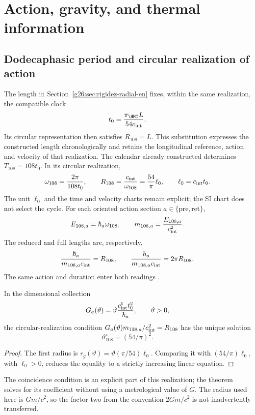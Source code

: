 \section{Action, gravity, and thermal information}
\label{v:ant:sec:gravity}
\subsection{Dodecaphasic period and circular realization of action}
The length in Section~\ref{g26:sec:rigidez-radial-en} fixes, within
the same realization, the compatible clock
\[
 t_0=\frac{\pi_{\HMT}L}{54c_{\rm int}}.
\]
Its circular representation then satisfies \(R_{108}=L\). This
substitution expresses the constructed length chronologically and retains
the longitudinal reference, action and velocity of that realization.
The calendar already constructed determines $T_{108}=108t_0$.
In its circular realization,
\[
\omega_{108}=\frac{2\pi}{108t_0},\qquad
R_{108}=\frac{c_{\rm int}}{\omega_{108}}
=\frac{54}{\pi}\ell_0,\qquad \ell_0=c_{\rm int}t_0.
\]
The unit $\ell_0$ and the time and velocity charts remain
explicit; the SI chart does not select the cycle.
For each oriented action section $a\in\{\mathrm{pre},\mathrm{ret}\}$,
\[
E_{108,a}=\hbar_a\omega_{108},\qquad
m_{108,a}=\frac{E_{108,a}}{c_{\rm int}^2}.
\]
The reduced and full lengths are, respectively,
\[
\frac{\hbar_a}{m_{108,a}c_{\rm int}}=R_{108},
\qquad
\frac{h_a}{m_{108,a}c_{\rm int}}=2\pi R_{108}.
\]
The same action and duration enter both readings
.

\begin{proposition}
In the dimensional collection
\[
G_a(\vartheta)=\vartheta\frac{c_{\rm int}^5t_0^2}{\hbar_a},
\qquad \vartheta>0,
\]
the circular-realization condition
$G_a(\vartheta)m_{108,a}/c_{\rm int}^2=R_{108}$
has the unique solution
\[
\vartheta^\circ_{108}=(54/\pi)^2.
\]
\end{proposition}
\begin{proof}
The first radius is
$r_g(\vartheta)=\vartheta(\pi/54)\ell_0$.
Comparing it with $(54/\pi)\ell_0$, with $\ell_0>0$, reduces the
equality to a strictly increasing linear equation.
\end{proof}
The coincidence condition is an explicit part of this realization;
the theorem solves for its coefficient without using a metrological value of $G$.
The radius used here is $Gm/c^2$, so the factor two from
the convention $2Gm/c^2$ is not inadvertently transferred.

